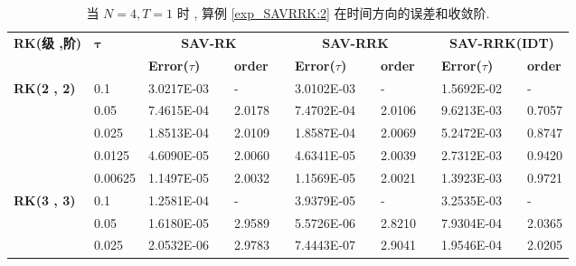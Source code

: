 \begin{table}[H]\scriptsize
\centering
\caption{当 $N=4 , T = 1$ 时 , 算例 \ref{exp_SAVRRK:2}  在时间方向的误差和收敛阶.}
\begin{tabular}{lllllrlrlrlrlrl}
\toprule
\multicolumn{2}{l}{\multirow{2}[3]{*}{\textbf{RK(级 ,阶)}}} & \multicolumn{2}{l}{\multirow{2}[3]{*}{$\bm{\tau}$}} & \multicolumn{3}{c}{\textbf{SAV-RK}} &       & \multicolumn{3}{c}{\textbf{SAV-RRK}} &       & \multicolumn{3}{c}{\textbf{SAV-RRK(IDT)}} \\
\cmidrule{5-7}\cmidrule{9-11}\cmidrule{13-15}    \multicolumn{2}{l}{} & \multicolumn{2}{l}{} & \textbf{Error($\tau$)} &       & \textbf{order} &       & \textbf{Error($\tau$)} &       & \textbf{order} &       & \textbf{Error($\tau$)} &       & \textbf{order} \\
\hline
\multicolumn{2}{l}{\multirow{5}[0]{*}{\textbf{RK(2 , 2)}}} & \multicolumn{2}{l}{0.1} & 3.0217E-03 &       & -     &       & 3.0102E-03 &       & -     &       & 1.5692E-02 &       & - \\
\multicolumn{2}{l}{} & \multicolumn{2}{l}{0.05} & 7.4615E-04 &       & 2.0178  &       & 7.4702E-04 &       & 2.0106  &       & 9.6213E-03 &       & 0.7057  \\
\multicolumn{2}{l}{} & \multicolumn{2}{l}{0.025} & 1.8513E-04 &       & 2.0109  &       & 1.8587E-04 &       & 2.0069  &       & 5.2472E-03 &       & 0.8747  \\
\multicolumn{2}{l}{} & \multicolumn{2}{l}{0.0125} & 4.6090E-05 &       & 2.0060  &       & 4.6341E-05 &       & 2.0039  &       & 2.7312E-03 &       & 0.9420  \\
\multicolumn{2}{l}{} & \multicolumn{2}{l}{0.00625} & 1.1497E-05 &       & 2.0032  &       & 1.1569E-05 &       & 2.0021  &       & 1.3923E-03 &       & 0.9721  \\
\multicolumn{2}{l}{\multirow{5}[0]{*}{\textbf{RK(3 , 3)}}} & \multicolumn{2}{l}{0.1} & 1.2581E-04 &       & -     &       & 3.9379E-05 &       & -     &       & 3.2535E-03 &       & - \\
\multicolumn{2}{l}{} & \multicolumn{2}{l}{0.05} & 1.6180E-05 &       & 2.9589  &       & 5.5726E-06 &       & 2.8210  &       & 7.9304E-04 &       & 2.0365  \\
\multicolumn{2}{l}{} & \multicolumn{2}{l}{0.025} & 2.0532E-06 &       & 2.9783  &       & 7.4443E-07 &       & 2.9041  &       & 1.9546E-04 &       & 2.0205  \\

\end{tabular}
\end{table}
